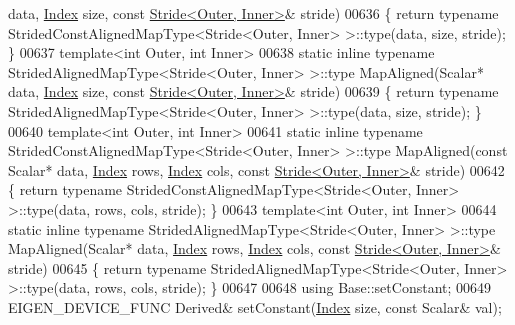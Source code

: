 \begin{DoxyCode}
       data, \hyperlink{namespace_eigen_a62e77e0933482dafde8fe197d9a2cfde}{Index} size, \textcolor{keyword}{const} \hyperlink{group___core___module_class_eigen_1_1_stride}{Stride<Outer, Inner>}& stride)
00636     \{ \textcolor{keywordflow}{return} \textcolor{keyword}{typename} StridedConstAlignedMapType<Stride<Outer, Inner> >::type(data, size, stride); \}
00637     \textcolor{keyword}{template}<\textcolor{keywordtype}{int} Outer, \textcolor{keywordtype}{int} Inner>
00638     \textcolor{keyword}{static} \textcolor{keyword}{inline} \textcolor{keyword}{typename} StridedAlignedMapType<Stride<Outer, Inner> >::type MapAligned(Scalar* data, 
      \hyperlink{namespace_eigen_a62e77e0933482dafde8fe197d9a2cfde}{Index} size, \textcolor{keyword}{const} \hyperlink{group___core___module_class_eigen_1_1_stride}{Stride<Outer, Inner>}& stride)
00639     \{ \textcolor{keywordflow}{return} \textcolor{keyword}{typename} StridedAlignedMapType<Stride<Outer, Inner> >::type(data, size, stride); \}
00640     \textcolor{keyword}{template}<\textcolor{keywordtype}{int} Outer, \textcolor{keywordtype}{int} Inner>
00641     \textcolor{keyword}{static} \textcolor{keyword}{inline} \textcolor{keyword}{typename} StridedConstAlignedMapType<Stride<Outer, Inner> >::type MapAligned(\textcolor{keyword}{const} Scalar*
       data, \hyperlink{namespace_eigen_a62e77e0933482dafde8fe197d9a2cfde}{Index} rows, \hyperlink{namespace_eigen_a62e77e0933482dafde8fe197d9a2cfde}{Index} cols, \textcolor{keyword}{const} \hyperlink{group___core___module_class_eigen_1_1_stride}{Stride<Outer, Inner>}& stride)
00642     \{ \textcolor{keywordflow}{return} \textcolor{keyword}{typename} StridedConstAlignedMapType<Stride<Outer, Inner> >::type(data, rows, cols, stride); \}
00643     \textcolor{keyword}{template}<\textcolor{keywordtype}{int} Outer, \textcolor{keywordtype}{int} Inner>
00644     \textcolor{keyword}{static} \textcolor{keyword}{inline} \textcolor{keyword}{typename} StridedAlignedMapType<Stride<Outer, Inner> >::type MapAligned(Scalar* data, 
      \hyperlink{namespace_eigen_a62e77e0933482dafde8fe197d9a2cfde}{Index} rows, \hyperlink{namespace_eigen_a62e77e0933482dafde8fe197d9a2cfde}{Index} cols, \textcolor{keyword}{const} \hyperlink{group___core___module_class_eigen_1_1_stride}{Stride<Outer, Inner>}& stride)
00645     \{ \textcolor{keywordflow}{return} \textcolor{keyword}{typename} StridedAlignedMapType<Stride<Outer, Inner> >::type(data, rows, cols, stride); \}
00647 
00648     \textcolor{keyword}{using} Base::setConstant;
00649     EIGEN\_DEVICE\_FUNC Derived& setConstant(\hyperlink{namespace_eigen_a62e77e0933482dafde8fe197d9a2cfde}{Index} size, \textcolor{keyword}{const} Scalar& val);

\end{DoxyCode}
